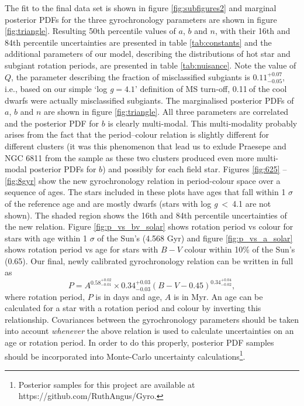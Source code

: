 \documentclass[11pt,preprint]{aastex}
\newcommand{\logg}{log \emph{g}}
\newcommand{\gyroa}{0.34}
\newcommand{\aerrp}{0.03}
\newcommand{\aerrm}{0.03}
\newcommand{\gyron}{0.58}
\newcommand{\nerrp}{0.02}
\newcommand{\nerrm}{0.01}
\newcommand{\gyrob}{0.34}
\newcommand{\berrp}{0.04}
\newcommand{\berrm}{0.02}
\newcommand{\Q}{0.11}
\newcommand{\Qerrp}{0.07}
\newcommand{\Qerrm}{0.05}
\begin{document}
The fit to the final data set is shown in figure \ref{fig:subfigures2} and
marginal posterior PDFs for the three gyrochronology parameters are
shown in figure \ref{fig:triangle}.
Resulting 50th percentile values of $a$, $b$ and $n$, with their 16th and 84th
percentile uncertainties are presented in table \ref{tab:constants} and the
additional parameters of our model, describing the distributions of hot star
and subgiant rotation periods, are presented in table \ref{tab:nuisance}.
Note the value of $Q$, the parameter describing the fraction of misclassified
subgiants is $\Q^{+\Qerrp}_{-\Qerrm}$, i.e., based on our simple `\logg$=4.1$'
definition of MS turn-off, \Q$~$of the cool dwarfs were actually
misclassified subgiants.
The marginalised posterior PDFs of $a$, $b$ and $n$ are shown in figure
\ref{fig:triangle}.
All three parameters are correlated and the posterior PDF for $b$ is clearly
multi-modal.
This multi-modality probably arises from the fact that the period--colour
relation is slightly different for different clusters (it was this phenomenon
that lead us to exlude Praesepe and NGC 6811 from the sample as these two
clusters produced even more multi-modal posterior PDFs for $b$) and possibly
for each field star.
Figures \ref{fig:625} -- \ref{fig:8gyr} show the new gyrochronology relation
in period-colour space over a sequence of ages.
The stars included in these plots have ages that fall within 1 $\sigma$ of the
reference age and are mostly dwarfs (stars with \logg$~<~$4.1 are not shown).
The shaded region shows the 16th and 84th percentile uncertainties of the new
relation.
Figure \ref{fig:p_vs_bv_solar} shows rotation period vs colour for stars with
age within 1 $\sigma$ of the Sun's (4.568 Gyr) and figure
\ref{fig:p_vs_a_solar} shows rotation period vs age for stars with $B-V$
colour within 10\% of the Sun's (0.65).
Our final, newly calibrated gyrochronology relation can be written in full as
\begin{equation}
	P = A^{\gyron^{+\nerrp}_{-\nerrm}} \times \gyroa^{+\aerrp}_{-\aerrm}
	(B-V-0.45)^{\gyrob^{+\berrp}_{-\berrm}},
\label{eq:Barnes2007_3}
\end{equation}
where rotation period, $P$ is in days and age, $A$ is in Myr.
An age can be calculated for a star with a rotation period and colour by
inverting this relationship.
Covariances between the gyrochronology parameters should
be taken into account {\it whenever} the above relation is used to calculate
uncertainties on an age or rotation period.
In order to do this properly, posterior PDF samples should be incorporated
into Monte-Carlo uncertainty calculations\footnote{Posterior samples for
this project are available at https://github.com/RuthAngus/Gyro.}.
\end{document}
